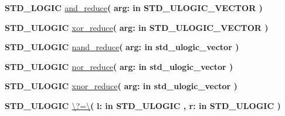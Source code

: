 \begin{DoxyCompactItemize}
\item 
{\bfseries {\bfseries \textcolor{comment}{S\+T\+D\+\_\+\+L\+O\+G\+I\+C}\textcolor{vhdlchar}{ }}} \hyperlink{class__fixed__pkg_a0536c01913c6769529a66bfcc9f9bb87}{and\+\_\+reduce}{\bfseries  ( }{\bfseries \textcolor{vhdlchar}{arg\+: }\textcolor{stringliteral}{in }{\bfseries \textcolor{comment}{S\+T\+D\+\_\+\+U\+L\+O\+G\+I\+C\+\_\+\+V\+E\+C\+T\+O\+R}\textcolor{vhdlchar}{ }}}{\bfseries  )} 
\item 
{\bfseries {\bfseries \textcolor{comment}{S\+T\+D\+\_\+\+U\+L\+O\+G\+I\+C}\textcolor{vhdlchar}{ }}} \hyperlink{class__fixed__pkg_a3db852db39bb903af86c2a19e79ea4e6}{xor\+\_\+reduce}{\bfseries  ( }{\bfseries \textcolor{vhdlchar}{arg\+: }\textcolor{stringliteral}{in }{\bfseries \textcolor{comment}{S\+T\+D\+\_\+\+U\+L\+O\+G\+I\+C\+\_\+\+V\+E\+C\+T\+O\+R}\textcolor{vhdlchar}{ }}}{\bfseries  )} 
\item 
{\bfseries {\bfseries \textcolor{comment}{S\+T\+D\+\_\+\+U\+L\+O\+G\+I\+C}\textcolor{vhdlchar}{ }}} \hyperlink{class__fixed__pkg_a27cbd59aad93927a5ee058a0e2f169b0}{nand\+\_\+reduce}{\bfseries  ( }{\bfseries \textcolor{vhdlchar}{arg\+: }\textcolor{stringliteral}{in }{\bfseries \textcolor{comment}{std\+\_\+ulogic\+\_\+vector}\textcolor{vhdlchar}{ }}}{\bfseries  )} 
\item 
{\bfseries {\bfseries \textcolor{comment}{S\+T\+D\+\_\+\+U\+L\+O\+G\+I\+C}\textcolor{vhdlchar}{ }}} \hyperlink{class__fixed__pkg_ac8075bc59e40ee363d9cb139385842d8}{nor\+\_\+reduce}{\bfseries  ( }{\bfseries \textcolor{vhdlchar}{arg\+: }\textcolor{stringliteral}{in }{\bfseries \textcolor{comment}{std\+\_\+ulogic\+\_\+vector}\textcolor{vhdlchar}{ }}}{\bfseries  )} 
\item 
{\bfseries {\bfseries \textcolor{comment}{S\+T\+D\+\_\+\+U\+L\+O\+G\+I\+C}\textcolor{vhdlchar}{ }}} \hyperlink{class__fixed__pkg_aca83a99961c380ec818ab475a7fccff7}{xnor\+\_\+reduce}{\bfseries  ( }{\bfseries \textcolor{vhdlchar}{arg\+: }\textcolor{stringliteral}{in }{\bfseries \textcolor{comment}{std\+\_\+ulogic\+\_\+vector}\textcolor{vhdlchar}{ }}}{\bfseries  )} 
\item 
{\bfseries {\bfseries \textcolor{comment}{S\+T\+D\+\_\+\+U\+L\+O\+G\+I\+C}\textcolor{vhdlchar}{ }}} \hyperlink{class__fixed__pkg_a2d4857284cabcf55fd984b2bbe6e0e1b}{\textbackslash{}?=\textbackslash{}}{\bfseries  ( }{\bfseries \textcolor{vhdlchar}{l\+: }\textcolor{stringliteral}{in }{\bfseries \textcolor{comment}{S\+T\+D\+\_\+\+U\+L\+O\+G\+I\+C}\textcolor{vhdlchar}{ }}}{\bfseries  , \textcolor{vhdlchar}{r\+: }\textcolor{stringliteral}{in }{\bfseries \textcolor{comment}{S\+T\+D\+\_\+\+U\+L\+O\+G\+I\+C}\textcolor{vhdlchar}{ }}}{\bfseries  )} 

\end{DoxyCompactItemize}
